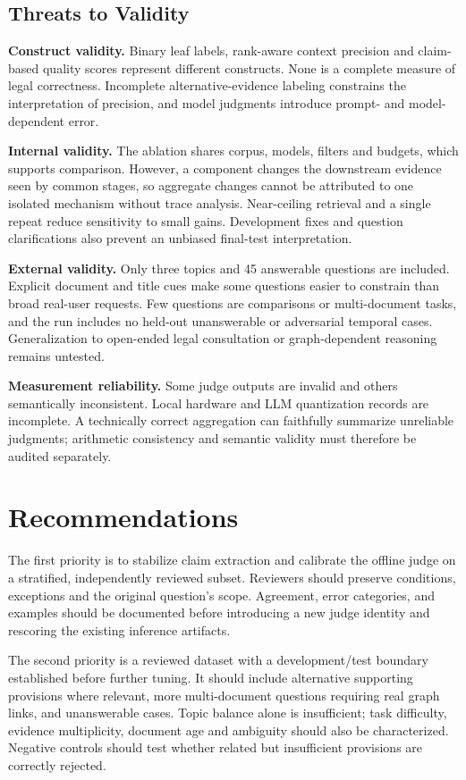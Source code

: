 \documentclass[11pt,a4paper,oneside]{report}
\begin{document}
\subsection{Threats to Validity}
\textbf{Construct validity.} Binary leaf labels, rank-aware context precision and claim-based quality scores represent different constructs. None is a complete measure of legal correctness. Incomplete alternative-evidence labeling constrains the interpretation of precision, and model judgments introduce prompt- and model-dependent error.

\textbf{Internal validity.} The ablation shares corpus, models, filters and budgets, which supports comparison. However, a component changes the downstream evidence seen by common stages, so aggregate changes cannot be attributed to one isolated mechanism without trace analysis. Near-ceiling retrieval and a single repeat reduce sensitivity to small gains. Development fixes and question clarifications also prevent an unbiased final-test interpretation.

\textbf{External validity.} Only three topics and 45 answerable questions are included. Explicit document and title cues make some questions easier to constrain than broad real-user requests. Few questions are comparisons or multi-document tasks, and the run includes no held-out unanswerable or adversarial temporal cases. Generalization to open-ended legal consultation or graph-dependent reasoning remains untested.

\textbf{Measurement reliability.} Some judge outputs are invalid and others semantically inconsistent. Local hardware and LLM quantization records are incomplete. A technically correct aggregation can faithfully summarize unreliable judgments; arithmetic consistency and semantic validity must therefore be audited separately.

\clearpage
\section{Recommendations}
The first priority is to stabilize claim extraction and calibrate the offline judge on a stratified, independently reviewed subset. Reviewers should preserve conditions, exceptions and the original question's scope. Agreement, error categories, and examples should be documented before introducing a new judge identity and rescoring the existing inference artifacts.

The second priority is a reviewed dataset with a development/test boundary established before further tuning. It should include alternative supporting provisions where relevant, more multi-document questions requiring real graph links, and unanswerable cases. Topic balance alone is insufficient; task difficulty, evidence multiplicity, document age and ambiguity should also be characterized. Negative controls should test whether related but insufficient provisions are correctly rejected.
\end{document}
